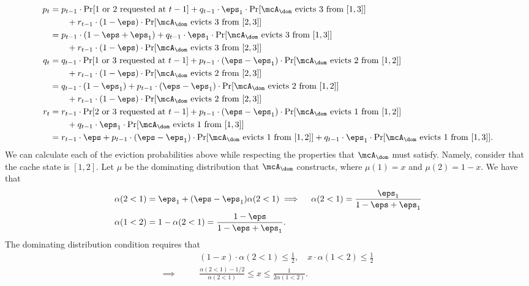 \begin{align*}
    p_t &= p_{t-1} \cdot \Pr[\text{1 or 2 requested at }t-1] + q_{t-1} \cdot \eps_1 \cdot \Pr[\text{$\mcA_\dom$ evicts 3 from }[1,3]] \\
    &\qquad+ r_{t-1} \cdot (1-\eps) \cdot \Pr[\text{$\mcA_\dom$ evicts 3 from }[2,3]] \\
    &= p_{t-1} \cdot (1-\eps+\eps_1) +  q_{t-1} \cdot \eps_1 \cdot \Pr[\text{$\mcA_\dom$ evicts 3 from }[1,3]] \\
    &\qquad+ r_{t-1} \cdot (1-\eps) \cdot \Pr[\text{$\mcA_\dom$ evicts 3 from }[2,3]] \\
    q_t &= q_{t-1} \cdot \Pr[\text{1 or 3 requested at }t-1] + p_{t-1} \cdot (\eps-\eps_1) \cdot \Pr[\text{$\mcA_\dom$ evicts 2 from }[1,2]] \\
    &\qquad+ r_{t-1} \cdot (1-\eps) \cdot \Pr[\text{$\mcA_\dom$ evicts 2 from }[2,3]] \\
    &= q_{t-1} \cdot (1-\eps_1) + p_{t-1} \cdot (\eps-\eps_1) \cdot \Pr[\text{$\mcA_\dom$ evicts 2 from }[1,2]] \\
    &\qquad+ r_{t-1} \cdot (1-\eps) \cdot \Pr[\text{$\mcA_\dom$ evicts 2 from }[2,3]] \\
    r_t &= r_{t-1} \cdot \Pr[\text{2 or 3 requested at }t-1] + p_{t-1} \cdot (\eps-\eps_1) \cdot \Pr[\text{$\mcA_\dom$ evicts 1 from }[1,2]] \\
    &\qquad+ q_{t-1} \cdot \eps_1 \cdot \Pr[\text{$\mcA_\dom$ evicts 1 from }[1,3]] \\
    &= r_{t-1} \cdot \eps + p_{t-1} \cdot (\eps-\eps_1) \cdot \Pr[\text{$\mcA_\dom$ evicts 1 from }[1,2]]  + q_{t-1} \cdot \eps_1 \cdot \Pr[\text{$\mcA_\dom$ evicts 1 from }[1,3]].
\end{align*}
We can calculate each of the eviction probabilities above while respecting the properties that $\mcA_\dom$ must satisfy. Namely, consider that the cache state is $[1,2]$. Let $\mu$ be the dominating distribution that $\mcA_\dom$ constructs, where $\mu(1)=x$ and $\mu(2)=1-x$. We have that
\begin{align*}
    \alpha(2<1) &= \eps_1 + (\eps-\eps_1)\alpha(2<1) \implies\quad \alpha(2<1) = \frac{\eps_1}{1-\eps+\eps_1} \\
    \alpha(1<2) &= 1-\alpha(2<1) = \frac{1-\eps}{1-\eps+\eps_1}.
\end{align*}
The dominating distribution condition requires that
\begin{align*}
    &(1-x)\cdot\alpha(2<1) \le \frac{1}{2}, \quad x\cdot\alpha(1<2) \le \frac{1}{2} \\ 
    \implies \qquad & \frac{\alpha(2<1)-1/2}{\alpha(2<1)} \le x \le \frac{1}{2\alpha(1<2)}.
\end{align*}
